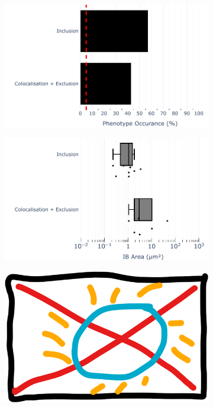 \begin{figure}
    \begin{subfigure}{0.5\textwidth}
        \caption{}
        \includegraphics[width=1\linewidth]{09. Chapter 4/Figs/03. pIB/01. IFIT1/07. bar_i1_vero_bnbp.pdf} 
    \end{subfigure}
    \begin{subfigure}{0.5\textwidth}
        \caption{}
        \includegraphics[width=1\linewidth]{09. Chapter 4/Figs/03. pIB/01. IFIT1/08. box_i1_vero_bnbp.pdf}
    \end{subfigure}
    \begin{subfigure}{1\textwidth}
        \centering
        \caption{}
        \includegraphics[width=1\linewidth]{09. Chapter 4/Figs/00. placeholder.png}

\end{subfigure}
\end{figure}
